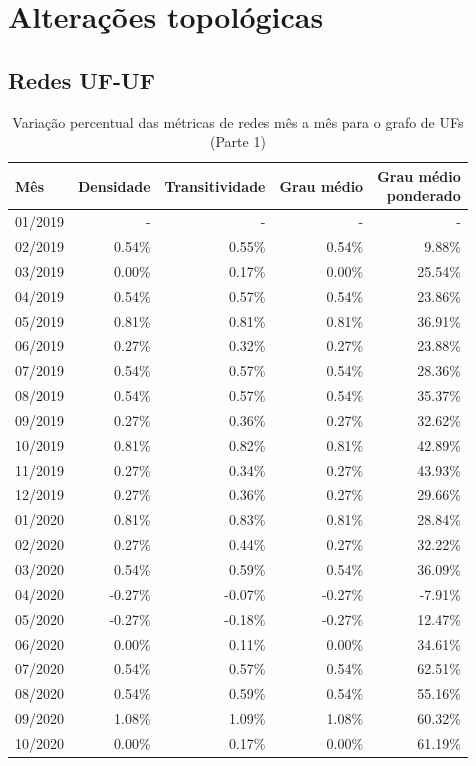 \section{Alterações topológicas}
\label{section:alteracoes-topologicas}

\subsection{Redes UF-UF}
\label{section:alteracoes-topologicas:uf}

\begin{table}[htb]
\centering
\caption{Variação percentual das métricas de redes mês a mês para o grafo de UFs (Parte 1)}
\label{tab:metricas-redes-pandemia:grafo-mensal-por-uf1}
\begin{tabular}{l|rrrr}
\toprule
Mês & Densidade & Transitividade & Grau médio & \shortstack{Grau médio\\ponderado} \\
\midrule
01/2019 & - & - & - & - \\
02/2019 &  0.54\% &  0.55\% &  0.54\% &  9.88\% \\
03/2019 &  0.00\% &  0.17\% &  0.00\% & 25.54\% \\
04/2019 &  0.54\% &  0.57\% &  0.54\% & 23.86\% \\
05/2019 &  0.81\% &  0.81\% &  0.81\% & 36.91\% \\
06/2019 &  0.27\% &  0.32\% &  0.27\% & 23.88\% \\
07/2019 &  0.54\% &  0.57\% &  0.54\% & 28.36\% \\
08/2019 &  0.54\% &  0.57\% &  0.54\% & 35.37\% \\
09/2019 &  0.27\% &  0.36\% &  0.27\% & 32.62\% \\
10/2019 &  0.81\% &  0.82\% &  0.81\% & 42.89\% \\
11/2019 &  0.27\% &  0.34\% &  0.27\% & 43.93\% \\
12/2019 &  0.27\% &  0.36\% &  0.27\% & 29.66\% \\
01/2020 &  0.81\% &  0.83\% &  0.81\% & 28.84\% \\
02/2020 &  0.27\% &  0.44\% &  0.27\% & 32.22\% \\
03/2020 &  0.54\% &  0.59\% &  0.54\% & 36.09\% \\
04/2020 & -0.27\% & -0.07\% & -0.27\% & -7.91\% \\
05/2020 & -0.27\% & -0.18\% & -0.27\% & 12.47\% \\
06/2020 &  0.00\% &  0.11\% &  0.00\% & 34.61\% \\
07/2020 &  0.54\% &  0.57\% &  0.54\% & 62.51\% \\
08/2020 &  0.54\% &  0.59\% &  0.54\% & 55.16\% \\
09/2020 &  1.08\% &  1.09\% &  1.08\% & 60.32\% \\
10/2020 &  0.00\% &  0.17\% &  0.00\% & 61.19\% \\
\bottomrule
\end{tabular}
\fdadospesquisa
\end{table}

